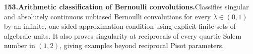 \documentclass[11pt,a4paper]{article}
\begin{document}
  \par \begin{minipage}{\linewidth}
  \fontsize{10.5}{12.6}\selectfont\RaggedRight
  \hypertarget{result 153}{}
  {\bfseries\textcolor{muted}{153.}\enspace Arithmetic classification of Bernoulli convolutions.}\enspace Classifies singular and absolutely continuous unbiased Bernoulli convolutions for every $\lambda\in(0,1)$ by an infinite, one-sided approximation condition using explicit finite sets of algebraic units. It also proves singularity at reciprocals of every quartic Salem number in $(1,2)$, giving examples beyond reciprocal Pisot parameters.\par
  \end{minipage}\par\vspace{5pt}
\end{document}
